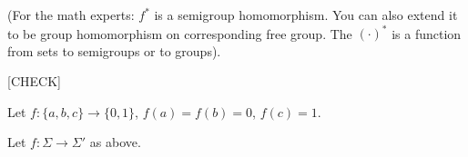 (For the math experts: $f^*$ is a semigroup homomorphism. You can
also extend it to be group homomorphism on corresponding free
group. The $(\cdot)^*$ is a function from sets to semigroups or to
groups).

[CHECK]

\begin{ex}
 Let $f : \{a,b,c\} \rightarrow \{0,1\}$, $f(a) = f(b) = 0$, $f(c) = 1$.
\end{ex}

\begin{ex}
 Let $f : \Sigma \rightarrow \Sigma'$ as above.
\end{ex}

